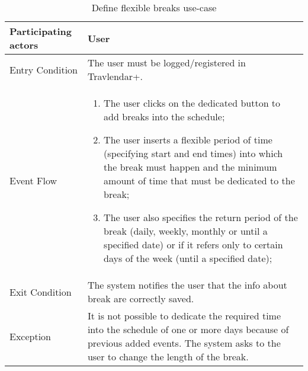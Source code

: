 \begin{table}[H]
	\begin{center}
		\begin{tabular}{ | p{} | p{} | }
		\hline
		Participating actors & User\\
		\hline
		Entry Condition & The user must be logged/registered in Travlendar+.\\
		\hline
		Event Flow & 
			\begin{enumerate}
				\item The user clicks on the dedicated button to add breaks into the schedule;
				\item The user inserts a flexible period of time (specifying start and end times) into which the break must happen and the minimum amount of time that must be dedicated to the break;
				\item The user also specifies the return period of the break (daily, weekly, monthly or until a specified date) or if it refers only to certain days of the week (until a specified date);
			\end{enumerate} \\
		\hline
		Exit Condition &  The system notifies the user that the info about break are correctly saved.\\
		\hline
		Exception & It is not possible to dedicate the required time into the schedule of one or more days because of previous added events. The system asks to the user to change the length of the break.
\\ 
		\hline
		\end{tabular}
	\end{center}
	\caption{Define flexible breaks use-case}
\end{table}